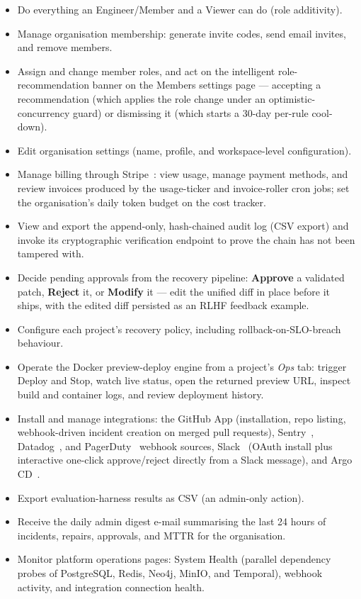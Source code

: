 \begin{itemize}[nosep]
  \item Do everything an Engineer/Member and a Viewer can do (role
        additivity).
  \item Manage organisation membership: generate invite codes, send email
        invites, and remove members.
  \item Assign and change member roles, and act on the intelligent
        role-recommendation banner on the Members settings page --- accepting
        a recommendation (which applies the role change under an
        optimistic-concurrency guard) or dismissing it (which starts a 30-day
        per-rule cool-down).
  \item Edit organisation settings (name, profile, and workspace-level
        configuration).
  \item Manage billing through Stripe~\cite{stripe}: view usage, manage
        payment methods, and review invoices produced by the usage-ticker and
        invoice-roller cron jobs; set the organisation's daily token budget on
        the cost tracker.
  \item View and export the append-only, hash-chained audit log (CSV export)
        and invoke its cryptographic verification endpoint to prove the chain
        has not been tampered with.
  \item Decide pending approvals from the recovery pipeline: \textbf{Approve}
        a validated patch, \textbf{Reject} it, or \textbf{Modify} it --- edit
        the unified diff in place before it ships, with the edited diff
        persisted as an RLHF feedback example.
  \item Configure each project's recovery policy, including
        rollback-on-SLO-breach behaviour.
  \item Operate the Docker preview-deploy engine from a project's
        \emph{Ops} tab: trigger Deploy and Stop, watch live status, open the
        returned preview URL, inspect build and container logs, and review
        deployment history.
  \item Install and manage integrations: the GitHub App (installation, repo
        listing, webhook-driven incident creation on merged pull requests),
        Sentry~\cite{sentry}, Datadog~\cite{datadog}, and
        PagerDuty~\cite{pagerduty} webhook sources, Slack~\cite{slackapi}
        (OAuth install plus interactive one-click approve/reject directly
        from a Slack message), and Argo CD~\cite{argocd}.
  \item Export evaluation-harness results as CSV (an admin-only action).
  \item Receive the daily admin digest e-mail summarising the last 24 hours
        of incidents, repairs, approvals, and MTTR for the organisation.
  \item Monitor platform operations pages: System Health (parallel dependency
        probes of PostgreSQL, Redis, Neo4j, MinIO, and Temporal), webhook
        activity, and integration connection health.
\end{itemize}

